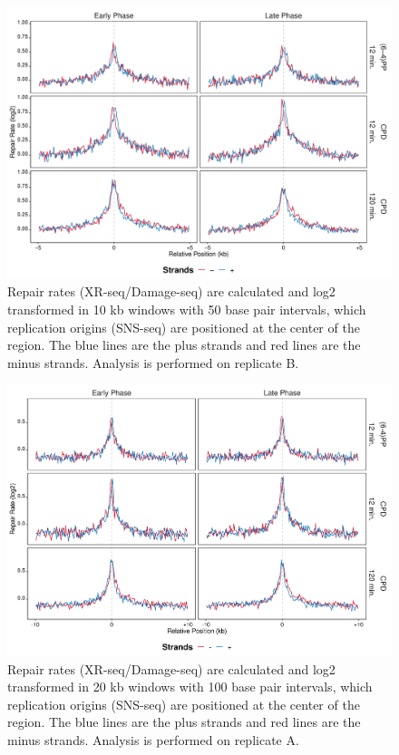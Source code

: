 \begin{figure}[H]
\begin{center}
\includegraphics[width=\textwidth]{Chapters/7_appendix/figures/supfig51}
\caption[Repair rate of replication origins in 10 kb (replicate B).]{Repair rates (XR-seq/Damage-seq) are calculated and log2 transformed in 10 kb windows with 50 base pair intervals, which replication origins (SNS-seq) are positioned at the center of the region. The blue lines are the plus strands and red lines are the minus strands. Analysis is performed on replicate B.}
\label{supfig:rr10snsB}
\end{center}
\end{figure}

\begin{figure}[H]
\begin{center}
\includegraphics[width=\textwidth]{Chapters/7_appendix/figures/supfig52}
\caption[Repair rate of replication origins in 20 kb (replicate A).]{Repair rates (XR-seq/Damage-seq) are calculated and log2 transformed in 20 kb windows with 100 base pair intervals, which replication origins (SNS-seq) are positioned at the center of the region. The blue lines are the plus strands and red lines are the minus strands. Analysis is performed on replicate A.}
\label{supfig:rr20snsA}
\end{center}
\end{figure}

